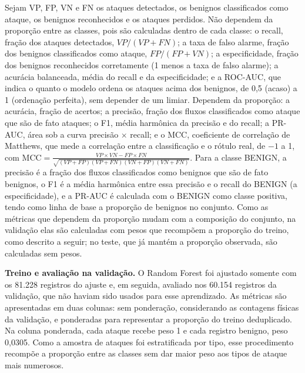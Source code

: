 \documentclass[
    12pt,                %
    openright,           %
    oneside,             %
    a4paper,             %
    english,             %
    brazil               %
]{abntex2}
\begin{document}
Sejam VP, FP, VN e FN os ataques detectados, os benignos classificados como ataque, os benignos reconhecidos e os ataques perdidos. Não dependem da proporção entre as classes, pois são calculadas dentro de cada classe: o recall, fração dos ataques detectados, \(VP/(VP+FN)\); a taxa de falso alarme, fração dos benignos classificados como ataque, \(FP/(FP+VN)\); a especificidade, fração dos benignos reconhecidos corretamente (1 menos a taxa de falso alarme); a acurácia balanceada, média do recall e da especificidade; e a ROC-AUC, que indica o quanto o modelo ordena os ataques acima dos benignos, de 0,5 (acaso) a 1 (ordenação perfeita), sem depender de um limiar. Dependem da proporção: a acurácia, fração de acertos; a precisão, fração dos fluxos classificados como ataque que são de fato ataques; o F1, média harmônica da precisão e do recall; a PR-AUC, área sob a curva precisão $\times$ recall; e o MCC, coeficiente de correlação de Matthews, que mede a correlação entre a classificação e o rótulo real, de $-1$ a 1, com \(\mathrm{MCC}=\frac{VP\times VN-FP\times FN}{\sqrt{(VP+FP)(VP+FN)(VN+FP)(VN+FN)}}\). Para a classe BENIGN, a precisão é a fração dos fluxos classificados como benignos que são de fato benignos, o F1 é a média harmônica entre essa precisão e o recall do BENIGN (a especificidade), e a PR-AUC é calculada com o BENIGN como classe positiva, tendo como linha de base a proporção de benignos no conjunto. Como as métricas que dependem da proporção mudam com a composição do conjunto, na validação elas são calculadas com pesos que recompõem a proporção do treino, como descrito a seguir; no teste, que já mantém a proporção observada, são calculadas sem pesos.

\textbf{Treino e avaliação na validação.} O Random Forest foi ajustado somente com os 81.228 registros do ajuste e, em seguida, avaliado nos 60.154 registros da validação, que não haviam sido usados para esse aprendizado. As métricas são apresentadas em duas colunas: sem ponderação, considerando as contagens físicas da validação, e ponderadas para representar a proporção do treino deduplicado. Na coluna ponderada, cada ataque recebe peso 1 e cada registro benigno, peso 0,0305. Como a amostra de ataques foi estratificada por tipo, esse procedimento recompõe a proporção entre as classes sem dar maior peso aos tipos de ataque mais numerosos.
\end{document}
